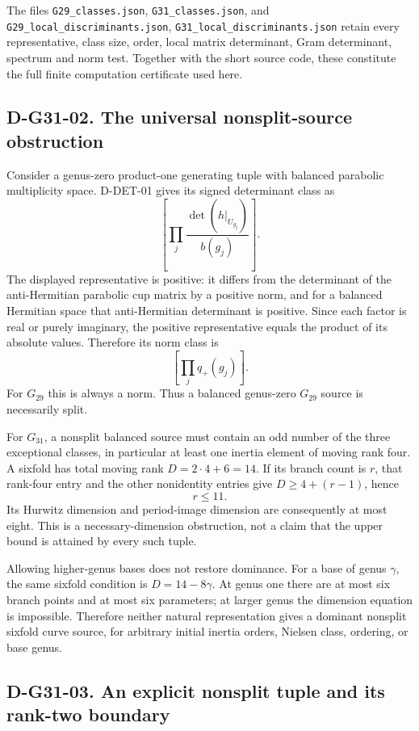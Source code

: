 The files \texttt{G29\_classes.json}, \texttt{G31\_classes.json}, and
\texttt{G29\_local\_discriminants.json},
\texttt{G31\_local\_discriminants.json} retain every representative,
class size, order, local matrix determinant, Gram determinant, spectrum
and norm test. Together with the short source code, these constitute
the full finite computation certificate used here.

\subsection*{D-G31-02. The universal nonsplit-source obstruction}

Consider a genus-zero product-one generating tuple with balanced
parabolic multiplicity space. D-DET-01 gives its signed determinant
class as
\[
                  \left[\prod_j\frac{\det(h|_{U_{g_j}})}{b(g_j)}\right].
\]
The displayed representative is positive: it differs from the determinant
of the anti-Hermitian parabolic cup matrix by a positive norm, and for
a balanced Hermitian space that anti-Hermitian determinant is positive.
Since each factor is real or purely imaginary, the positive representative
equals the product of its absolute values. Therefore its norm class is
\[
                              \left[\prod_jq_+(g_j)\right].
\]
For \(G_{29}\) this is always a norm. Thus a balanced genus-zero
\(G_{29}\) source is necessarily split.

For \(G_{31}\), a nonsplit balanced source must contain an odd number
of the three exceptional classes, in particular at least one inertia
element of moving rank four. A sixfold has total moving rank
\(D=2\cdot4+6=14\). If its branch count is \(r\), that rank-four
entry and the other nonidentity entries give \(D\ge4+(r-1)\), hence
\[
                              r\le11.
\]
Its Hurwitz dimension and period-image dimension are consequently at most
eight. This is a necessary-dimension obstruction, not a claim that the
upper bound is attained by every such tuple.

Allowing higher-genus bases does not restore dominance. For a base of
genus \(\gamma\), the same sixfold condition is
\(D=14-8\gamma\). At genus one there are at most six branch points
and at most six parameters; at larger genus the dimension equation is
impossible. Therefore neither natural representation gives a dominant
nonsplit sixfold curve source, for arbitrary initial inertia orders,
Nielsen class, ordering, or base genus.

\subsection*{D-G31-03. An explicit nonsplit tuple and its rank-two boundary}

